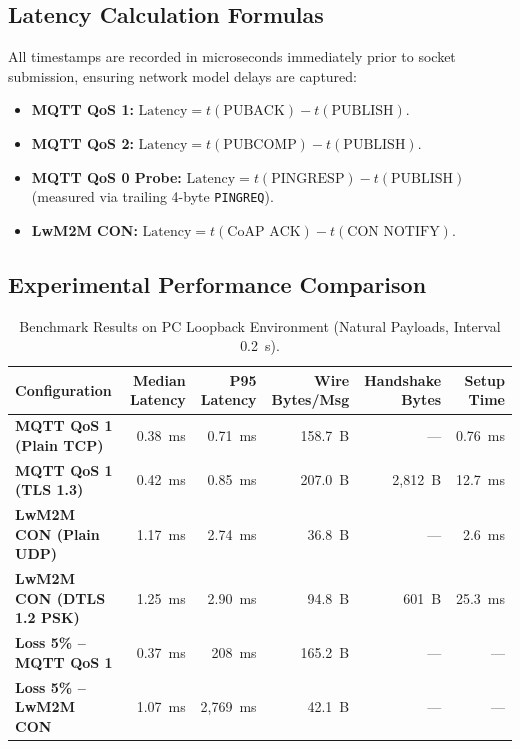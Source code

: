 \documentclass[11pt,a4paper]{article}
\newcommand{\code}[1]{\texttt{#1}}
\begin{document}
\subsection{Latency Calculation Formulas}
All timestamps are recorded in microseconds immediately prior to socket submission, ensuring network model delays are captured:
\begin{itemize}
  \item \textbf{MQTT QoS 1:} $\text{Latency} = t(\text{PUBACK}) - t(\text{PUBLISH})$.
  \item \textbf{MQTT QoS 2:} $\text{Latency} = t(\text{PUBCOMP}) - t(\text{PUBLISH})$.
  \item \textbf{MQTT QoS 0 Probe:} $\text{Latency} = t(\text{PINGRESP}) - t(\text{PUBLISH})$ (measured via trailing 4-byte \code{PINGREQ}).
  \item \textbf{LwM2M CON:} $\text{Latency} = t(\text{CoAP ACK}) - t(\text{CON NOTIFY})$.
\end{itemize}

\subsection{Experimental Performance Comparison}

\begin{table}[htbp]
\centering
\small
\begin{tabularx}{\textwidth}{l r r r r r}
\toprule
\textbf{Configuration} & \textbf{Median Latency} & \textbf{P95 Latency} & \textbf{Wire Bytes/Msg} & \textbf{Handshake Bytes} & \textbf{Setup Time} \\
\midrule
\textbf{MQTT QoS 1 (Plain TCP)} & 0.38~ms & 0.71~ms & 158.7~B & --- & 0.76~ms \\
\textbf{MQTT QoS 1 (TLS 1.3)} & 0.42~ms & 0.85~ms & 207.0~B & 2,812~B & 12.7~ms \\
\textbf{LwM2M CON (Plain UDP)} & 1.17~ms & 2.74~ms & 36.8~B & --- & 2.6~ms \\
\textbf{LwM2M CON (DTLS 1.2 PSK)} & 1.25~ms & 2.90~ms & 94.8~B & 601~B & 25.3~ms \\
\midrule
\textbf{Loss 5\% -- MQTT QoS 1} & 0.37~ms & 208~ms & 165.2~B & --- & --- \\
\textbf{Loss 5\% -- LwM2M CON} & 1.07~ms & 2,769~ms & 42.1~B & --- & --- \\
\bottomrule
\end{tabularx}
\caption{Benchmark Results on PC Loopback Environment (Natural Payloads, Interval 0.2~s).}
\label{tab:results}
\end{table}
\end{document}
